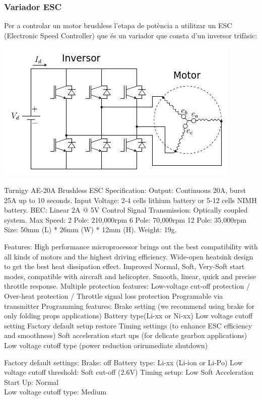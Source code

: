 \documentclass[twoside]{article}
\begin{document}
\subsubsection*{Variador ESC}

Per a controlar un motor brushless l'etapa de potència a utilitzar un ESC (Electronic Speed Controller) que és un  variador que consta d'un inversor trifàsic:
\begin{center}
\includegraphics[scale=0.4]{images/ESC.jpeg}
\end{center}

Turnigy AE-20A Brushless ESC
Specification:
Output:  Continuous 20A, burst 25A up to 10 seconds.
Input Voltage:  2-4 cells lithium battery or 5-12 cells NIMH battery.   
BEC:  Linear 2A @ 5V
Control Signal Transmission: Optically coupled system.
Max Speed:     
   2 Pole: 210,000rpm
   6 Pole: 70,000rpm
   12 Pole: 35,000rpm
Size:  50mm (L) * 26mm (W) * 12mm (H).
Weight:  19g.

Features:
High performance microprocessor brings out the best compatibility with all kinds of motors and the highest driving efficiency.
Wide-open heatsink design to get the best heat dissipation effect.
Improved Normal, Soft, Very-Soft start modes, compatible with aircraft and helicopter. 
Smooth, linear, quick and precise throttle response.
Multiple protection features: Low-voltage cut-off protection / Over-heat protection / Throttle signal loss protection
Programable via transmitter
Programming features:
Brake setting (we recommend using brake for only folding props applications)
Battery type(Li-xx or Ni-xx) 
Low voltage cutoff setting 
Factory default setup restore 
Timing settings (to enhance ESC efficiency and smoothness) 
Soft acceleration start ups (for delicate gearbox applications)
Low voltage cutoff type (power reduction orirnmediate shutdown)
 
Factory default settings:
Brake:  off 
Battery type:  Li-xx (Li-ion or Li-Po) 
Low voltage cutoff threshold:  Soft cut-off (2.6V) 
Timing setup:  Low 
Soft Acceleration Start Up:  Normal \\
Low voltage cutoff type:  Medium
\end{document}
